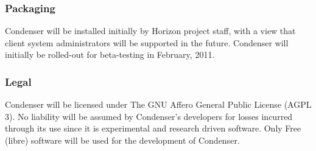 		\subsubsection{Packaging}
Condenser will be installed initially by Horizon project staff, with a view that client system administrators will be supported in the future. Condenser will initially be rolled-out for beta-testing in February, 2011.  		
		\subsubsection{Legal}
Condenser will be licensed under The GNU Affero General Public License (AGPL 3). No liability will be assumed by Condenser's developers for losses incurred through its use since it is experimental and research driven software. Only Free (libre) software will be used for the development of Condenser.		